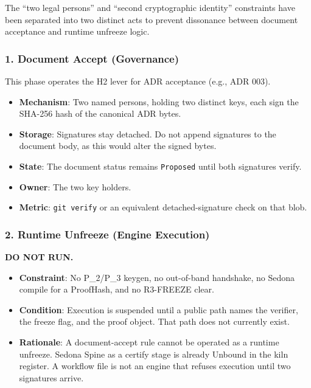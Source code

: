 \documentclass[
]{article}
\author{}
\date{}
\providecommand{\tightlist}{%
  \setlength{\itemsep}{0pt}\setlength{\parskip}{0pt}}
\begin{document}
The ``two legal persons'' and ``second cryptographic identity''
constraints have been separated into two distinct acts to prevent
dissonance between document acceptance and runtime unfreeze logic.

\hypertarget{document-accept-governance}{%
\subsubsection{1. Document Accept
(Governance)}\label{document-accept-governance}}

This phase operates the H2 lever for ADR acceptance (e.g., ADR 003).

\begin{itemize}
\tightlist
\item
  \textbf{Mechanism}: Two named persons, holding two distinct keys, each
  sign the SHA-256 hash of the canonical ADR bytes.
\item
  \textbf{Storage}: Signatures stay detached. Do not append signatures
  to the document body, as this would alter the signed bytes.
\item
  \textbf{State}: The document status remains \texttt{Proposed} until
  both signatures verify.
\item
  \textbf{Owner}: The two key holders.
\item
  \textbf{Metric}: \texttt{git\ verify} or an equivalent
  detached-signature check on that blob.
\end{itemize}

\hypertarget{runtime-unfreeze-engine-execution}{%
\subsubsection{2. Runtime Unfreeze (Engine
Execution)}\label{runtime-unfreeze-engine-execution}}

\textbf{DO NOT RUN.}

\begin{itemize}
\tightlist
\item
  \textbf{Constraint}: No P\_2/P\_3 keygen, no out-of-band handshake, no
  Sedona compile for a ProofHash, and no R3-FREEZE clear.
\item
  \textbf{Condition}: Execution is suspended until a public path names
  the verifier, the freeze flag, and the proof object. That path does
  not currently exist.
\item
  \textbf{Rationale}: A document-accept rule cannot be operated as a
  runtime unfreeze. Sedona Spine as a certify stage is already Unbound
  in the kiln register. A workflow file is not an engine that refuses
  execution until two signatures arrive.
\end{itemize}
\end{document}
